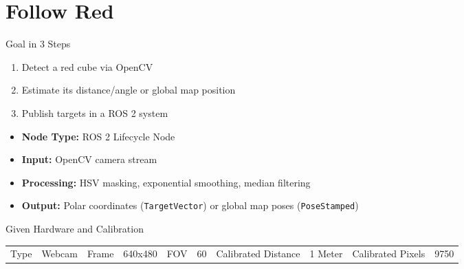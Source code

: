 \documentclass[aspectratio=169, 11pt]{beamer}
\begin{document}
\section{Follow Red}
\begin{frame}{Goal in 3 Steps}
    \begin{enumerate}
        \item Detect a red cube via OpenCV
        \item Estimate its distance/angle or global map position 
        \item Publish targets in a ROS 2 system
    \end{enumerate}

    \vspace{0.3cm}
    \begin{itemize}
        \item \textbf{Node Type:} ROS 2 Lifecycle Node
        \item \textbf{Input:} OpenCV camera stream
        \item \textbf{Processing:} HSV masking, exponential smoothing, median filtering
        \item \textbf{Output:} Polar coordinates (\texttt{TargetVector}) or global map poses (\texttt{PoseStamped})
    \end{itemize}
\end{frame}

\begin{frame}{Given Hardware and Calibration}
    \begin{table}[]
        \centering
        \begin{tabular}{c|c}
             Type & Webcam
             & Frame & 640x480
             & FOV & 60
             & Calibrated Distance & 1 Meter 
             & Calibrated Pixels & 9750
        \end{tabular}
    \end{table}
\end{frame}
\end{document}
